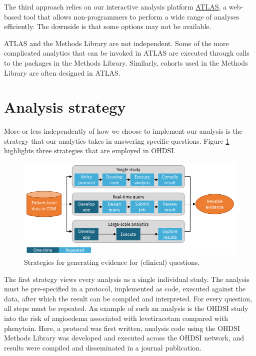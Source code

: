 \documentclass[11pt]{book}
\theoremstyle{definition}
\theoremstyle{definition}
\theoremstyle{definition}
\theoremstyle{remark}
\begin{document}
The third approach relies on our interactive analysis platform \href{https://github.com/OHDSI/Atlas/wiki}{ATLAS}, a web-based tool that allows non-programmers to perform a wide range of analyses efficiently. The downside is that some options may not be available.

ATLAS and the Methods Library are not independent. Some of the more complicated analytics that can be invoked in ATLAS are executed through calls to the packages in the Methods Library. Similarly, cohorts used in the Methods Library are often designed in ATLAS.

\hypertarget{analysis-strategy}{%
\section{Analysis strategy}\label{analysis-strategy}}

More or less independently of how we choose to implement our analysis is the strategy that our analytics takes in answering specific questions. Figure \ref{fig:strategies} highlights three strategies that are employed in OHDSI.

\begin{figure}

{\centering \includegraphics[width=0.9\linewidth]{images/OhdsiAnalyticsTools/strategies} 

}

\caption{Strategies for generating evidence for (clinical) questions.}\label{fig:strategies}
\end{figure}

The first strategy views every analysis as a single individual study. The analysis must be pre-specified in a protocol, implemented as code, executed against the data, after which the result can be compiled and interpreted. For every question, all steps must be repeated. An example of such an analysis is the OHDSI study into the risk of angioedema associated with levetiracetam compared with phenytoin. \citep{duke_2017} Here, a protocol was first written, analysis code using the OHDSI Methods Library was developed and executed across the OHDSI network, and results were compiled and disseminated in a journal publication.
\end{document}
